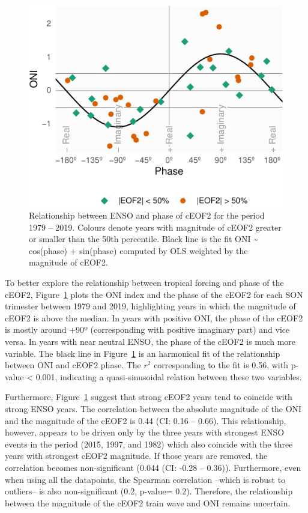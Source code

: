 \documentclass[smallextended]{svjour3}       %
\begin{document}
\begin{figure}
\centering
\includegraphics{../figures/enso-phase-1.pdf}
\caption{\label{fig:enso-phase}Relationship between ENSO and phase of cEOF2 for the period 1979 -- 2019. Colours denote years with magnitude of cEOF2 greater or smaller than the 50th percentile. Black line is the fit ONI \textasciitilde{} cos(phase) + sin(phase) computed by OLS weighted by the magnitude of cEOF2.}
\end{figure}

To better explore the relationship between tropical forcing and phase of the cEOF2, Figure~\ref{fig:enso-phase} plots the ONI index and the phase of the cEOF2 for each SON trimester between 1979 and 2019, highlighting years in which the magnitude of cEOF2 is above the median. In years with positive ONI, the phase of the cEOF2 is mostly around +90º (corresponding with positive imaginary part) and vice versa. In years with near neutral ENSO, the phase of the cEOF2 is much more variable. The black line in Figure~\ref{fig:enso-phase} is an harmonical fit of the relationship between ONI and cEOF2 phase. The \(r^2\) corresponding to the fit is 0.56, with p-value \textless{} 0.001, indicating a quasi-sinusoidal relation between these two variables.

Furthermore, Figure~\ref{fig:enso-phase} suggest that strong cEOF2 years tend to coincide with strong ENSO years. The correlation between the absolute magnitude of the ONI and the magnitude of the cEOF2 is 0.44 (CI: 0.16 -- 0.66). This relationship, however, appears to be driven only by the three years with strongest ENSO events in the period (2015, 1997, and 1982) which also coincide with the three years with strongest cEOF2 magnitude. If those years are removed, the correlation becomes non-significant (0.044 (CI: -0.28 -- 0.36)). Furthermore, even when using all the datapoints, the Spearman correlation --which is robust to outliers-- is also non-significant (0.2, p-value= 0.2). Therefore, the relationship between the magnitude of the cEOF2 train wave and ONI remains uncertain.
\end{document}
